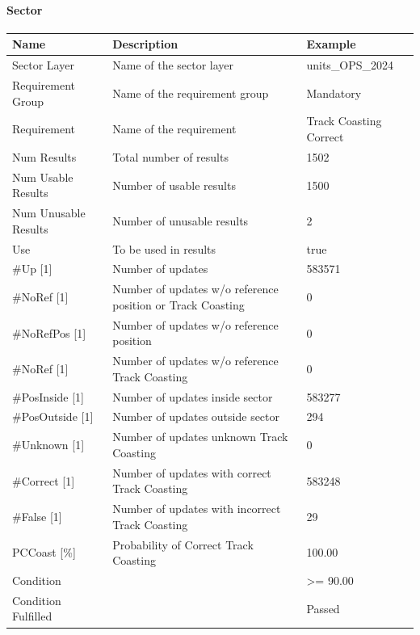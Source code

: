 \paragraph{Sector}

\begin{center}
 \begin{table}[H]
  \begin{tabularx}{\textwidth}{ | l | X |  l | }
    \hline
    \textbf{Name} & \textbf{Description} & \textbf{Example} \\ \hline
    Sector Layer & Name of the sector layer & units\_OPS\_2024 \\ \hline
    Requirement Group & Name of the requirement group & Mandatory \\ \hline
    Requirement & Name of the requirement & Track Coasting Correct \\ \hline
    Num Results & Total number of results & 1502 \\ \hline
    Num Usable Results & Number of usable results & 1500 \\ \hline
    Num Unusable Results & Number of unusable results & 2 \\ \hline
    Use & To be used in results & true \\ \hline
    \#Up [1] & Number of updates & 583571 \\ \hline
    \#NoRef [1] & Number of updates w/o reference position or Track Coasting & 0 \\ \hline
    \#NoRefPos [1] & Number of updates w/o reference position & 0 \\ \hline
    \#NoRef [1] & Number of updates w/o reference Track Coasting & 0 \\ \hline
    \#PosInside [1] & Number of updates inside sector & 583277 \\ \hline
    \#PosOutside [1] & Number of updates outside sector & 294 \\ \hline
    \#Unknown [1] & Number of updates unknown Track Coasting & 0 \\ \hline
    \#Correct [1] & Number of updates with correct Track Coasting & 583248 \\ \hline
    \#False [1] & Number of updates with incorrect Track Coasting & 29 \\ \hline
    PCCoast [\%] & Probability of Correct Track Coasting & 100.00 \\ \hline
    Condition &  & >= 90.00 \\ \hline
    Condition Fulfilled &  & Passed \\ \hline
    \end{tabularx}
\end{table}
\end{center}

